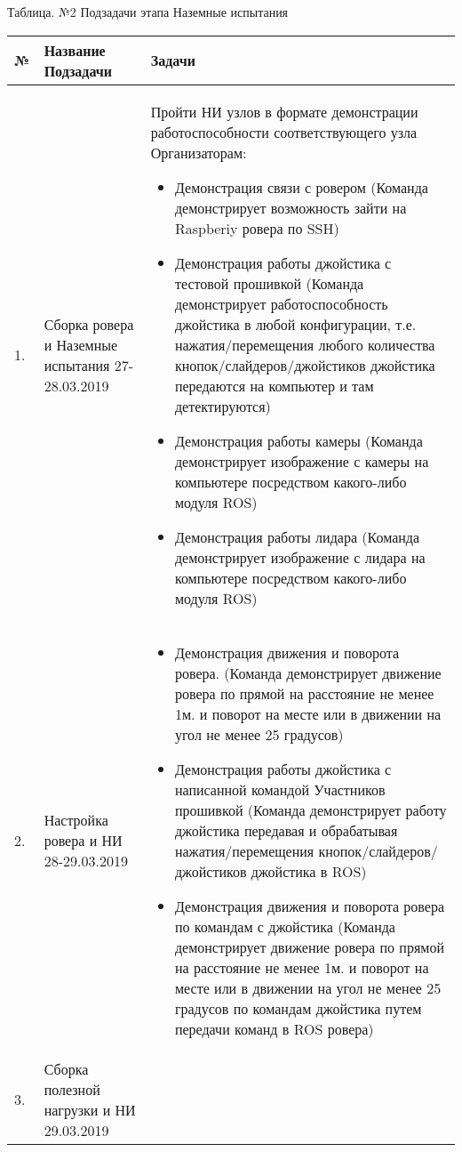 \begin{center}
    Таблица. №2 Подзадачи этапа Наземные испытания
\end{center}
\begin{longtable}{|p{0.5cm}|p{3.5cm}|p{10.5cm}|}
    \hline
    № & Название Подзадачи & Задачи \\
    \hline
    1. & Сборка ровера и Наземные испытания 27-28.03.2019 &	Пройти НИ узлов в формате демонстрации работоспособности соответствующего узла Организаторам:
    \begin{itemize}
        \item Демонстрация связи с ровером (Команда демонстрирует возможность зайти на Raspberiy ровера по SSH)
        \item Демонстрация работы джойстика с тестовой прошивкой (Команда демонстрирует работоспособность джойстика в любой конфигурации, т.е. нажатия/перемещения любого количества кнопок/слайдеров/джойстиков джойстика передаются на компьютер и там детектируются)
        \item Демонстрация работы камеры (Команда демонстрирует изображение с камеры на компьютере посредством какого-либо модуля ROS)
        \item Демонстрация работы лидара (Команда демонстрирует изображение с лидара на компьютере посредством какого-либо модуля ROS)
    \end{itemize} \\
    \hline
    2. & Настройка ровера и НИ 28-29.03.2019 & 
    \begin{itemize}
        \item Демонстрация движения и поворота ровера. (Команда демонстрирует движение ровера по прямой на расстояние не менее 1м. и поворот на месте или в движении на угол не менее 25 градусов)
        \item Демонстрация работы джойстика с написанной командой Участников прошивкой (Команда демонстрирует работу джойстика передавая и обрабатывая нажатия/перемещения кнопок/слайдеров/джойстиков джойстика в ROS)
        \item Демонстрация движения и поворота ровера по командам с джойстика (Команда демонстрирует движение ровера по прямой на расстояние не менее 1м. и поворот на месте или в движении на угол не менее 25 градусов по командам джойстика путем передачи команд в ROS ровера)
    \end{itemize} \\
    \hline
    3. & Сборка полезной нагрузки и НИ 29.03.2019 & 
    \begin{itemize} 

\end{itemize}
\end{longtable}
